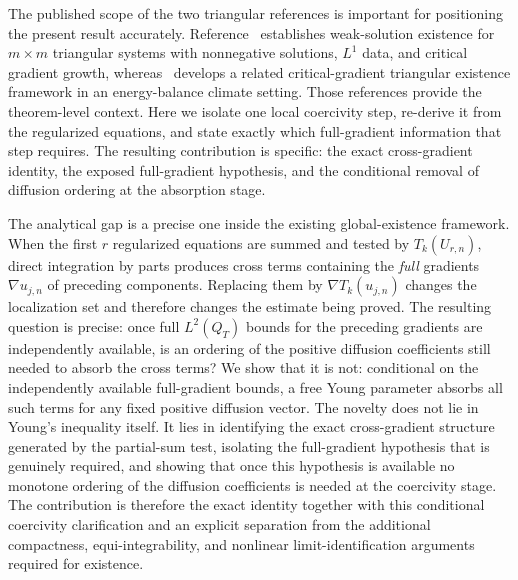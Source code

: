 The published scope of the two triangular references is important for positioning the present result accurately. Reference~\cite{alaa2013triangular} establishes weak-solution existence for $m\times m$ triangular systems with nonnegative solutions, $L^1$ data, and critical gradient growth, whereas~\cite{bouarifi2015climate} develops a related critical-gradient triangular existence framework in an energy-balance climate setting. Those references provide the theorem-level context. Here we isolate one local coercivity step, re-derive it from the regularized equations, and state exactly which full-gradient information that step requires. The resulting contribution is specific: the exact cross-gradient identity, the exposed full-gradient hypothesis, and the conditional removal of diffusion ordering at the absorption stage.

The analytical gap is a precise one inside the existing global-existence framework. When the first $r$ regularized equations are summed and tested by $T_k(U_{r,n})$, direct integration by parts produces cross terms containing the \emph{full} gradients $\nabla u_{j,n}$ of preceding components. Replacing them by $\nabla T_k(u_{j,n})$ changes the localization set and therefore changes the estimate being proved. The resulting question is precise: once full $L^2(Q_T)$ bounds for the preceding gradients are independently available, is an ordering of the positive diffusion coefficients still needed to absorb the cross terms? We show that it is not: conditional on the independently available full-gradient bounds, a free Young parameter absorbs all such terms for any fixed positive diffusion vector. The novelty does not lie in Young's inequality itself. It lies in identifying the exact cross-gradient structure generated by the partial-sum test, isolating the full-gradient hypothesis that is genuinely required, and showing that once this hypothesis is available no monotone ordering of the diffusion coefficients is needed at the coercivity stage. The contribution is therefore the exact identity together with this conditional coercivity clarification and an explicit separation from the additional compactness, equi-integrability, and nonlinear limit-identification arguments required for existence.

